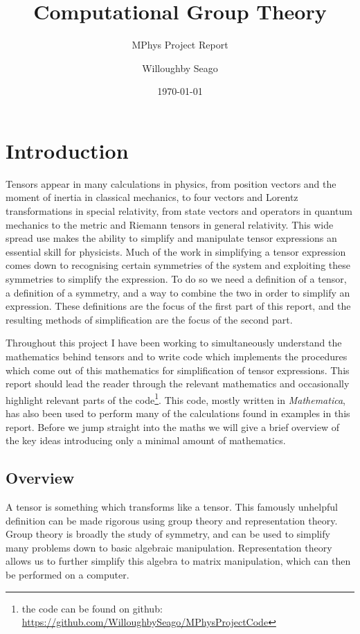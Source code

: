 \documentclass[fleqn]{NotesClass}
\title{Computational Group Theory}
\author{Willoughby Seago}
\date{\today}
\subtitle{MPhys Project Report}
\newcommand{\Mathematica}{\textit{Mathematica}}
\begin{document}
    \frontmatter
    \titlepage
    \maketitle
    \tableofcontents
    \mainmatter
    
    \chapter{Introduction}
    Tensors appear in many calculations in physics, from position vectors and the moment of inertia in classical mechanics, to four vectors and Lorentz transformations in special relativity, from state vectors and operators in quantum mechanics to the metric and Riemann tensors in general relativity.
    This wide spread use makes the ability to simplify and manipulate tensor expressions an essential skill for physicists.
    Much of the work in simplifying a tensor expression comes down to recognising certain symmetries of the system and exploiting these symmetries to simplify the expression.
    To do so we need a definition of a tensor, a definition of a symmetry, and a way to combine the two in order to simplify an expression.
    These definitions are the focus of the first part of this report, and the resulting methods of simplification are the focus of the second part.
    
    Throughout this project I have been working to simultaneously understand the mathematics behind tensors and to write code which implements the procedures which come out of this mathematics for simplification of tensor expressions.
    This report should lead the reader through the relevant mathematics and occasionally highlight relevant parts of the code\footnote{the code can be found on github: \url{https://github.com/WilloughbySeago/MPhysProjectCode}}.
    This code, mostly written in \Mathematica{}, has also been used to perform many of the calculations found in examples in this report.
    Before we jump straight into the maths we will give a brief overview of the key ideas introducing only a minimal amount of mathematics.
    
    \section{Overview}\label{sec:overview}
    A tensor is something which transforms like a tensor.
    This famously unhelpful definition can be made rigorous using group theory and representation theory.
    Group theory is broadly the study of symmetry, and can be used to simplify many problems down to basic algebraic manipulation.
    Representation theory allows us to further simplify this algebra to matrix manipulation, which can then be performed on a computer.
    
\end{document}
